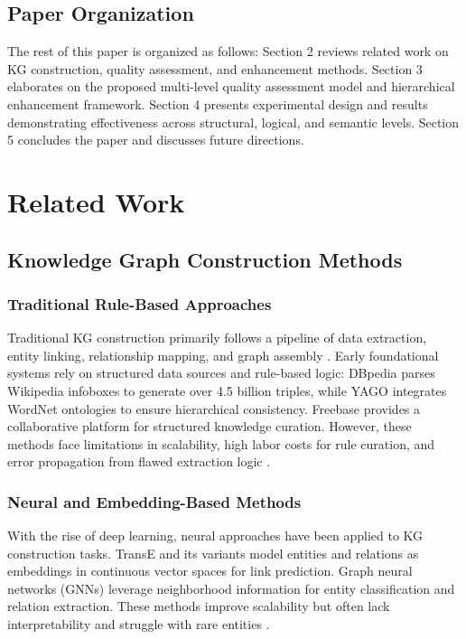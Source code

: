 \documentclass[runningheads]{llncs}
\begin{document}
\subsection{Paper Organization}
The rest of this paper is organized as follows: Section 2 reviews related work on KG construction, quality assessment, and enhancement methods. Section 3 elaborates on the proposed multi-level quality assessment model and hierarchical enhancement framework. Section 4 presents experimental design and results demonstrating effectiveness across structural, logical, and semantic levels. Section 5 concludes the paper and discusses future directions.

\section{Related Work}
\label{sec:related_work}

\subsection{Knowledge Graph Construction Methods}

\subsubsection{Traditional Rule-Based Approaches}
Traditional KG construction primarily follows a pipeline of data extraction, entity linking, relationship mapping, and graph assembly \cite{ref_ji2021}. Early foundational systems rely on structured data sources and rule-based logic: DBpedia \cite{ref_auer2007} parses Wikipedia infoboxes to generate over 4.5 billion triples, while YAGO \cite{ref_suchanek2007} integrates WordNet ontologies to ensure hierarchical consistency. Freebase \cite{ref_bollacker2008} provides a collaborative platform for structured knowledge curation. However, these methods face limitations in scalability, high labor costs for rule curation, and error propagation from flawed extraction logic \cite{ref_dong2014}.

\subsubsection{Neural and Embedding-Based Methods}
With the rise of deep learning, neural approaches have been applied to KG construction tasks. TransE \cite{ref_bordes2013} and its variants model entities and relations as embeddings in continuous vector spaces for link prediction. Graph neural networks (GNNs) \cite{ref_schlichtkrull2018} leverage neighborhood information for entity classification and relation extraction. These methods improve scalability but often lack interpretability and struggle with rare entities \cite{ref_wang2017}.
\end{document}
